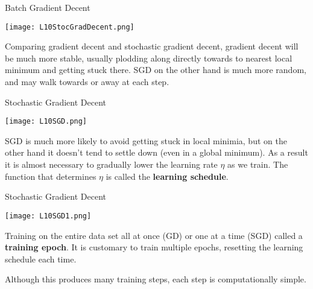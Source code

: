 \documentclass[10pt, table, dvipsnames,xcdraw, handout]{beamer}
\begin{document}
\begin{frame}[fragile]{Batch Gradient Decent}
  \begin{minipage}[t][0.5\textheight][t]{\textwidth}
	\centering \texttt{[image: L10StocGradDecent.png]} 
  \end{minipage}
  \vfill
\begin{minipage}[t][0.5\textheight][t]{\textwidth}
Comparing gradient decent and stochastic gradient decent, gradient decent will be much more stable, usually plodding along directly towards to nearest local minimum and getting stuck there. SGD on the other hand is much more random, and may walk towards or away at each step.
\end{minipage}
\end{frame}





\begin{frame}[fragile]{Stochastic Gradient Decent}
  \begin{minipage}[t][0.5\textheight][t]{\textwidth}
	\centering \texttt{[image: L10SGD.png]} 
  \end{minipage}
  \vfill
\begin{minipage}[t][0.5\textheight][t]{\textwidth}
SGD is much more likely to avoid getting stuck in local minimia, but on the other hand it doesn't tend to settle down (even in a global minimum). As a result it is almost necessary to gradually lower the learning rate $\eta$ as we train. The function that determines $\eta$ is called the \textbf{learning schedule}. 
\end{minipage}
\end{frame}






\begin{frame}[fragile]{Stochastic Gradient Decent}
  \begin{minipage}[t][0.5\textheight][t]{\textwidth}
	\centering \texttt{[image: L10SGD1.png]} 
  \end{minipage}
  \vfill
\begin{minipage}[t][0.5\textheight][t]{\textwidth}
Training on the entire data set all at once (GD) or one at a time (SGD) called a \textbf{training epoch}. It is customary to train multiple epochs, resetting the learning schedule each time.  

Although this produces many training steps, each step is computationally simple. 
\end{minipage}

\end{frame}
\end{document}
